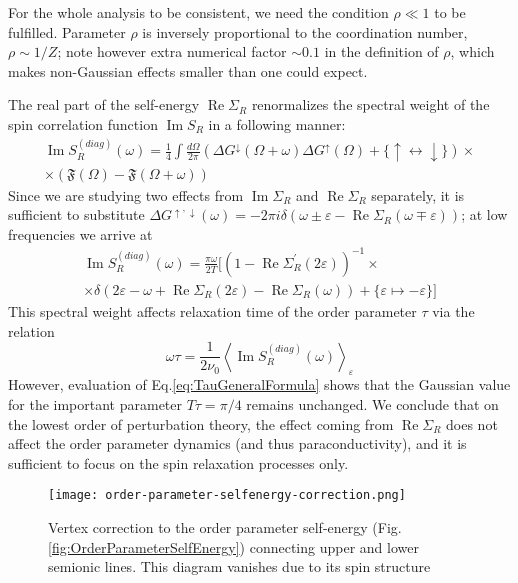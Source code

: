 \documentclass[twocolumn,english,prb]{revtex4-1}
\renewcommand{\Re}{\operatorname{Re}}
\renewcommand{\Im}{\operatorname{Im}}
\begin{document}
For the whole analysis to be consistent, we need the
condition $\rho \ll 1 $ to be fulfilled. 
Parameter $\rho$ is inversely proportional to the coordination number, $\rho \sim 1/Z$; 
note however extra numerical factor $\sim 0.1$ in the definition of $\rho$,
which makes non-Gaussian effects smaller than one could expect.

The real part of the self-energy $\Re \Sigma_R$ renormalizes the spectral weight of the spin correlation function $\Im S_R$ in a following manner:
\begin{multline}
\Im S_{R}^{(diag)}(\omega)=\frac{1}{4}\int\frac{d\Omega}{2\pi}(\Delta G^{\downarrow}(\Omega+\omega)\Delta G^{\uparrow}(\Omega) + \{\uparrow \leftrightarrow \downarrow\}) \times \\
\times(\mathfrak{F}(\Omega)-\mathfrak{F}(\Omega+\omega))
\end{multline}
Since we are studying two effects from $\Im \Sigma_R$ and $\Re \Sigma_R$ separately, it is sufficient to substitute $\Delta G^{\uparrow,\downarrow}(\omega) = -2 \pi i \delta(\omega \pm \varepsilon - \Re \Sigma_R(\omega \mp \varepsilon))$; at low  frequencies we arrive at
\begin{multline}
\Im S_{R}^{(diag)}(\omega)=\frac{\pi\omega}{2T}\Big[(1-\Re\Sigma_{R}^{\prime}(2\varepsilon))^{-1} \times\\
\times\delta(2\varepsilon-\omega+\Re\Sigma_{R}(2\varepsilon)-\Re\Sigma_{R}(\omega))+\{\varepsilon\mapsto-\varepsilon\}\Big]
\end{multline}
This spectral weight affects relaxation time of the order parameter $\tau$ via the relation
\begin{equation}
\label{eq:TauGeneralFormula}
\omega\tau=\frac{1}{2\nu_0}\left\langle \Im S_{R}^{(diag)}(\omega)\right\rangle _{\varepsilon}
\end{equation}
However, evaluation  of Eq.\eqref{eq:TauGeneralFormula} shows that the Gaussian value for the important parameter $T \tau = \pi / 4$ remains unchanged.  We conclude that on the lowest order of perturbation theory, the effect coming from $\Re \Sigma_R$ does not affect 
the order parameter dynamics (and thus paraconductivity), and it is sufficient to focus on the spin relaxation processes only.

\begin{figure}
	\centering
	\texttt{[image: order-parameter-selfenergy-correction.png]}
	\caption{Vertex correction to the order parameter self-energy (Fig.\ref{fig:OrderParameterSelfEnergy}) connecting upper and lower semionic lines. This diagram vanishes due to its spin structure}
	\label{fig:OrderParameterSelfEnergyCorrection}
\end{figure}
\end{document}
